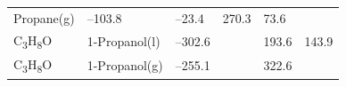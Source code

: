 \documentclass[
  9pt,
]{extbook}
\theoremstyle{definition}
\theoremstyle{definition}
\theoremstyle{definition}
\theoremstyle{remark}
\begin{document}
\begin{longtable}[]{@{}llllll@{}}
\begin{minipage}[t]{0.17\columnwidth}
Propane(g)\strut
\end{minipage} & \begin{minipage}[t]{0.15\columnwidth}\raggedright
--103.8\strut
\end{minipage} & \begin{minipage}[t]{0.15\columnwidth}\raggedright
--23.4\strut
\end{minipage} & \begin{minipage}[t]{0.14\columnwidth}\raggedright
270.3\strut
\end{minipage} & \begin{minipage}[t]{0.14\columnwidth}\raggedright
73.6\strut
\end{minipage}\tabularnewline
\begin{minipage}[t]{0.07\columnwidth}\raggedright
C\textsubscript{3}H\textsubscript{8}O\strut
\end{minipage} & \begin{minipage}[t]{0.17\columnwidth}\raggedright
1-Propanol(l)\strut
\end{minipage} & \begin{minipage}[t]{0.15\columnwidth}\raggedright
--302.6\strut
\end{minipage} & \begin{minipage}[t]{0.15\columnwidth}\raggedright
\strut
\end{minipage} & \begin{minipage}[t]{0.14\columnwidth}\raggedright
193.6\strut
\end{minipage} & \begin{minipage}[t]{0.14\columnwidth}\raggedright
143.9\strut
\end{minipage}\tabularnewline
\begin{minipage}[t]{0.07\columnwidth}\raggedright
C\textsubscript{3}H\textsubscript{8}O\strut
\end{minipage} & \begin{minipage}[t]{0.17\columnwidth}\raggedright
1-Propanol(g)\strut
\end{minipage} & \begin{minipage}[t]{0.15\columnwidth}\raggedright
--255.1\strut
\end{minipage} & \begin{minipage}[t]{0.15\columnwidth}\raggedright
\strut
\end{minipage} & \begin{minipage}[t]{0.14\columnwidth}\raggedright
322.6\strut
\end{minipage} & \begin{minipage}[t]{0.14\columnwidth}\raggedright

\end{minipage}
\end{longtable}
\end{document}
